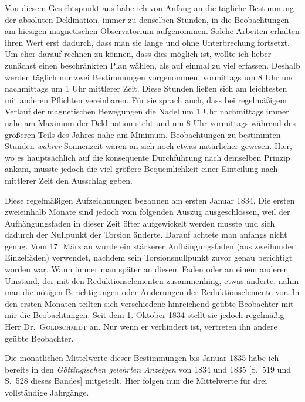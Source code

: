 Von diesem Gesichtspunkt aus habe ich von Anfang an die tägliche Bestimmung der absoluten Deklination, immer zu denselben Stunden, in die Beobachtungen am hiesigen magnetischen Observatorium aufgenommen. Solche Arbeiten erhalten ihren Wert erst dadurch, dass man sie lange und ohne Unterbrechung fortsetzt. Um eher darauf rechnen zu können, dass dies möglich ist, wollte ich lieber zunächst einen beschränkten Plan wählen, als auf einmal zu viel erfassen. Deshalb werden täglich nur zwei Bestimmungen vorgenommen, vormittags um 8 Uhr und nachmittags um 1 Uhr mittlerer Zeit. Diese Stunden ließen sich am leichtesten mit anderen Pflichten vereinbaren. Für sie sprach auch, dass bei regelmäßigem Verlauf der magnetischen Bewegungen die Nadel um 1 Uhr nachmittags immer nahe am Maximum der Deklination steht und um 8 Uhr vormittags während des größeren Teils des Jahres nahe am Minimum. Beobachtungen zu bestimmten Stunden \textit{wahrer} Sonnenzeit wären an sich noch etwas natürlicher gewesen. Hier, wo es hauptsächlich auf die konsequente Durchführung nach demselben Prinzip ankam, musste jedoch die viel größere Bequemlichkeit einer Einteilung nach mittlerer Zeit den Ausschlag geben.

Diese regelmäßigen Aufzeichnungen begannen am ersten Januar 1834. Die ersten zweieinhalb Monate sind jedoch vom folgenden Auszug ausgeschlossen, weil der Aufhängungsfaden in dieser Zeit öfter aufgewickelt werden musste und sich dadurch der Nullpunkt der Torsion änderte. Darauf achtete man anfangs nicht genug. Vom 17. März an wurde ein stärkerer Aufhängungsfaden (aus zweihundert Einzelfäden) verwendet, nachdem sein Torsionsnullpunkt zuvor genau berichtigt worden war. Wann immer man später an diesem Faden oder an einem anderen Umstand, der mit den
Reduktionselementen zusammenhing, etwas änderte, nahm man die nötigen Berichtigungen oder Änderungen der Reduktionselemente vor. In den ersten Monaten teilten sich verschiedene hinreichend geübte Beobachter mit mir die Beobachtungen. Seit dem 1. Oktober 1834 stellt sie jedoch regelmäßig Herr Dr.~\textsc{Goldschmidt} an. Nur wenn er verhindert ist, vertreten ihn andere geübte Beobachter.

Die monatlichen Mittelwerte dieser Bestimmungen bis Januar 1835 habe ich bereits in den \textit{Göttingischen gelehrten Anzeigen} von 1834 und 1835 [S.\ 519 und S.\ 528 dieses Bandes] mitgeteilt. Hier folgen nun die Mittelwerte für drei vollständige Jahrgänge.

